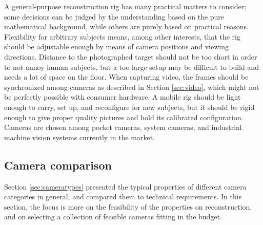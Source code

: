A general-purpose reconstruction rig has many practical matters to consider; some decisions can be judged by the understanding based on the pure mathematical background, while others are purely based on practical reasons.
Flexibility for arbitrary subjects means, among other interests, that the rig should be adjustable enough by means of camera positions and viewing directions.
Distance to the photographed target should not be too short in order to not annoy human subjects, but a too large setup may be difficult to build and needs a lot of space on the floor.
When capturing video, the frames should be synchronized among cameras as described in Section \ref{sec:video}, which might not be perfectly possible with consumer hardware.
A mobile rig should be light enough to carry, set up, and reconfigure for new subjects, but it should be rigid enough to give proper quality pictures and hold its calibrated configuration.
Cameras are chosen among pocket cameras, system cameras, and industrial machine vision systems currently in the market.


\subsection{Camera comparison} \label{sec:cameracomparison} %

Section \ref{sec:cameratypes} presented the typical properties of different camera categories in general, and compared them to technical requirements.
In this section, the focus is more on the feasibility of the properties on reconstruction, and on selecting a collection of feasible cameras fitting in the budget.

